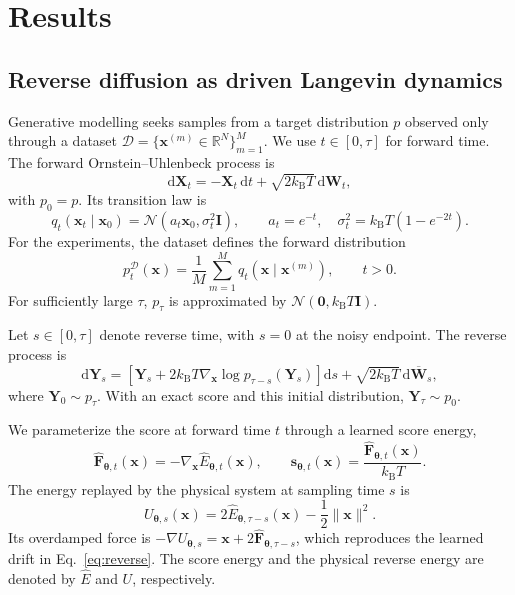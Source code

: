 \documentclass[referee,lineno,pdflatex,sn-nature]{sn-jnl}
\newcommand{\kBT}{k_{\mathrm B}T}
\newcommand{\vect}[1]{\boldsymbol{#1}}
\newcommand{\Ehat}{\widehat E}
\newcommand{\Fhat}{\widehat{\vect F}}
\begin{document}
\section{Results}\label{sec:results}

\subsection{Reverse diffusion as driven Langevin dynamics}

Generative modelling seeks samples from a target distribution $p$ observed only
through a dataset
$\mathcal D=\{\vect x^{(m)}\in\mathbb R^N\}_{m=1}^{M}$. We use
$t\in[0,\tau]$ for forward time. The forward Ornstein--Uhlenbeck process is
\begin{equation}\label{eq:forward}
  \mathrm d\vect X_t=-\vect X_t\,\mathrm dt
  +\sqrt{2\kBT}\,\mathrm d\vect W_t,
\end{equation}
with $p_0=p$. Its transition law is
\begin{equation}\label{eq:ou-transition}
  q_t(\vect x_t\mid\vect x_0)
  =\mathcal N(a_t\vect x_0,\sigma_t^2\vect I),\qquad
  a_t=e^{-t},\quad \sigma_t^2=\kBT(1-e^{-2t}).
\end{equation}
For the experiments, the dataset defines the forward distribution
\begin{equation}\label{eq:empirical-smoothed}
 p_t^{\mathcal D}(\vect x)=\frac{1}{M}\sum_{m=1}^{M}
 q_t(\vect x\mid\vect x^{(m)}), \qquad t>0.
\end{equation}
For sufficiently large $\tau$, $p_\tau$ is approximated by
$\mathcal N(\vect 0,\kBT\vect I)$.

Let $s\in[0,\tau]$ denote reverse time, with $s=0$ at the noisy endpoint. The
reverse process is \cite{anderson1982reverse,song2021scorebased}
\begin{equation}\label{eq:reverse}
  \mathrm d\vect Y_s=
  \left[\vect Y_s+2\kBT\nabla_{\vect x}\log p_{\tau-s}(\vect Y_s)\right]
  \mathrm ds+\sqrt{2\kBT}\,\mathrm d\overline{\vect W}_s,
\end{equation}
where $\vect Y_0\sim p_\tau$. With an exact score and this initial distribution,
$\vect Y_\tau\sim p_0$.

We parameterize the score at forward time $t$ through a learned score energy,
\begin{equation}\label{eq:force-score}
  \Fhat_{\vect\theta,t}(\vect x)
  =-\nabla_{\vect x}\Ehat_{\vect\theta,t}(\vect x),\qquad
  \vect s_{\vect\theta,t}(\vect x)
  =\frac{\Fhat_{\vect\theta,t}(\vect x)}{\kBT}.
\end{equation}
The energy replayed by the physical system at sampling time $s$ is
\begin{equation}\label{eq:reverse-energy}
  U_{\vect\theta,s}(\vect x)
  =2\Ehat_{\vect\theta,\tau-s}(\vect x)
  -\frac{1}{2}\lVert\vect x\rVert^2 .
\end{equation}
Its overdamped force is
$-\nabla U_{\vect\theta,s}=\vect x+2\Fhat_{\vect\theta,\tau-s}$,
which reproduces the learned drift in Eq.~\eqref{eq:reverse}. The score energy and
the physical reverse energy are denoted by $\Ehat$ and $U$, respectively.
\end{document}
